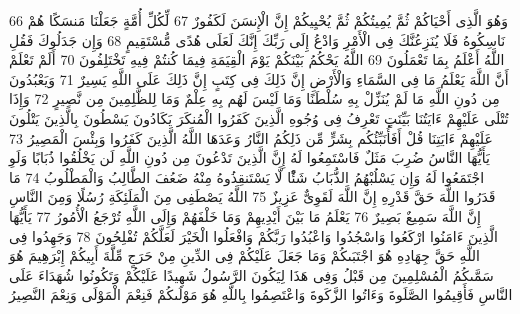 \documentclass[20pt,a4paper]{article}
\begin{document}
{\tiny\colorbox{cl_aya}{66}} وَهُوَ الَّذِى أَحْيَاكُمْ ثُمَّ يُمِيتُكُمْ ثُمَّ يُحْيِيكُمْ إِنَّ الْإِنسَنَ لَكَفُورٌ
{\tiny\colorbox{cl_aya}{67}} لِّكُلِّ أُمَّةٍ جَعَلْنَا مَنسَكًا هُمْ نَاسِكُوهُ فَلَا يُنَزِعُنَّكَ فِى الْأَمْرِ وَادْعُ إِلَى رَبِّكَ إِنَّكَ لَعَلَى هُدًى مُّسْتَقِيمٍ
{\tiny\colorbox{cl_aya}{68}} وَإِن جَدَلُوكَ فَقُلِ اللَّهُ أَعْلَمُ بِمَا تَعْمَلُونَ
{\tiny\colorbox{cl_aya}{69}} اللَّهُ يَحْكُمُ بَيْنَكُمْ يَوْمَ الْقِيَمَةِ فِيمَا كُنتُمْ فِيهِ تَخْتَلِفُونَ
{\tiny\colorbox{cl_aya}{70}} أَلَمْ تَعْلَمْ أَنَّ اللَّهَ يَعْلَمُ مَا فِى السَّمَاءِ وَالْأَرْضِ إِنَّ ذَلِكَ فِى كِتَبٍ إِنَّ ذَلِكَ عَلَى اللَّهِ يَسِيرٌ
{\tiny\colorbox{cl_aya}{71}} وَيَعْبُدُونَ مِن دُونِ اللَّهِ مَا لَمْ يُنَزِّلْ بِهِ سُلْطَنًا وَمَا لَيْسَ لَهُم بِهِ عِلْمٌ وَمَا لِلظَّلِمِينَ مِن نَّصِيرٍ
{\tiny\colorbox{cl_aya}{72}} وَإِذَا تُتْلَى عَلَيْهِمْ ءَايَتُنَا بَيِّنَتٍ تَعْرِفُ فِى وُجُوهِ الَّذِينَ كَفَرُوا الْمُنكَرَ يَكَادُونَ يَسْطُونَ بِالَّذِينَ يَتْلُونَ عَلَيْهِمْ ءَايَتِنَا قُلْ أَفَأُنَبِّئُكُم بِشَرٍّ مِّن ذَلِكُمُ النَّارُ وَعَدَهَا اللَّهُ الَّذِينَ كَفَرُوا وَبِئْسَ الْمَصِيرُ
{\tiny\colorbox{cl_aya}{73}} يَأَيُّهَا النَّاسُ ضُرِبَ مَثَلٌ فَاسْتَمِعُوا لَهُ إِنَّ الَّذِينَ تَدْعُونَ مِن دُونِ اللَّهِ لَن يَخْلُقُوا ذُبَابًا وَلَوِ اجْتَمَعُوا لَهُ وَإِن يَسْلُبْهُمُ الذُّبَابُ شَئًْا لَّا يَسْتَنقِذُوهُ مِنْهُ ضَعُفَ الطَّالِبُ وَالْمَطْلُوبُ
{\tiny\colorbox{cl_aya}{74}} مَا قَدَرُوا اللَّهَ حَقَّ قَدْرِهِ إِنَّ اللَّهَ لَقَوِىٌّ عَزِيزٌ
{\tiny\colorbox{cl_aya}{75}} اللَّهُ يَصْطَفِى مِنَ الْمَلَئِكَةِ رُسُلًا وَمِنَ النَّاسِ إِنَّ اللَّهَ سَمِيعٌ بَصِيرٌ
{\tiny\colorbox{cl_aya}{76}} يَعْلَمُ مَا بَيْنَ أَيْدِيهِمْ وَمَا خَلْفَهُمْ وَإِلَى اللَّهِ تُرْجَعُ الْأُمُورُ
{\tiny\colorbox{cl_aya}{77}} يَأَيُّهَا الَّذِينَ ءَامَنُوا ارْكَعُوا وَاسْجُدُوا وَاعْبُدُوا رَبَّكُمْ وَافْعَلُوا الْخَيْرَ لَعَلَّكُمْ تُفْلِحُونَ
{\tiny\colorbox{cl_aya}{78}} وَجَهِدُوا فِى اللَّهِ حَقَّ جِهَادِهِ هُوَ اجْتَبَىكُمْ وَمَا جَعَلَ عَلَيْكُمْ فِى الدِّينِ مِنْ حَرَجٍ مِّلَّةَ أَبِيكُمْ إِبْرَهِيمَ هُوَ سَمَّىكُمُ الْمُسْلِمِينَ مِن قَبْلُ وَفِى هَذَا لِيَكُونَ الرَّسُولُ شَهِيدًا عَلَيْكُمْ وَتَكُونُوا شُهَدَاءَ عَلَى النَّاسِ فَأَقِيمُوا الصَّلَوةَ وَءَاتُوا الزَّكَوةَ وَاعْتَصِمُوا بِاللَّهِ هُوَ مَوْلَىكُمْ فَنِعْمَ الْمَوْلَى وَنِعْمَ النَّصِيرُ
\end{document}
